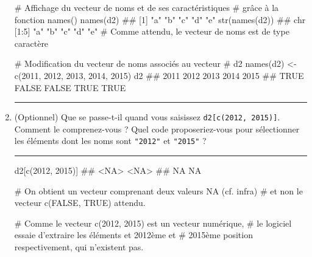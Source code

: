 \documentclass[12pt,twosided, notitlepage]{book}
\newenvironment{Shaded}{}{}
\newcommand{\KeywordTok}[1]{\textcolor[rgb]{0.00,0.00,1.00}{#1}}
\newcommand{\DecValTok}[1]{#1}
\newcommand{\StringTok}[1]{\textcolor[rgb]{0.00,0.50,0.50}{#1}}
\newcommand{\CommentTok}[1]{\textcolor[rgb]{0.00,0.50,0.00}{#1}}
\newcommand{\NormalTok}[1]{#1}
\newif \ifsol
\renewenvironment{Shaded}{\begin{snugshade}}{\end{snugshade}}
\begin{document}
\begin{enumerate}
\begin{Shaded}
\begin{Highlighting}[]
\CommentTok{# Affichage du vecteur de noms et de ses caractéristiques}
\CommentTok{# grâce à la fonction names()}
\KeywordTok{names}\NormalTok{(d2)}
\NormalTok{  ## [1] "a" "b" "c" "d" "e"}
\KeywordTok{str}\NormalTok{(}\KeywordTok{names}\NormalTok{(d2))}
\NormalTok{  ##  chr [1:5] "a" "b" "c" "d" "e"}
\CommentTok{# Comme attendu, le vecteur de noms est de type caractère}

\CommentTok{# Modification du vecteur de noms associés au vecteur}
\CommentTok{# d2}
\KeywordTok{names}\NormalTok{(d2) <-}\StringTok{ }\KeywordTok{c}\NormalTok{(}\DecValTok{2011}\NormalTok{, }\DecValTok{2012}\NormalTok{, }\DecValTok{2013}\NormalTok{, }\DecValTok{2014}\NormalTok{, }\DecValTok{2015}\NormalTok{)}
\NormalTok{d2}
\NormalTok{  ##  2011  2012  2013  2014  2015 }
\NormalTok{  ##  TRUE FALSE FALSE  TRUE  TRUE}
\end{Highlighting}
\end{Shaded}

  \begin{center} \rule{0.5\linewidth}{\linethickness}\end{center}

  \bigskip  \fi 
\item
  (Optionnel) Que se passe-t-il quand vous saisissez
  \texttt{d2{[}c(2012,\ 2015){]}}\index{\texttt{[}}. Comment le
  comprenez-vous ? Quel code proposeriez-vous pour sélectionner les
  éléments dont les noms sont \texttt{"2012"} et \texttt{"2015"} ?

  \ifsol  \textbf{Indication} Quel est le type du vecteur de noms
  associé à \texttt{d2} ?\fi  \ifsol 

  \begin{center} \rule{0.5\linewidth}{\linethickness}\end{center}

\begin{Shaded}
\begin{Highlighting}[]
\NormalTok{d2[}\KeywordTok{c}\NormalTok{(}\DecValTok{2012}\NormalTok{, }\DecValTok{2015}\NormalTok{)]}
\NormalTok{  ## <NA> <NA> }
\NormalTok{  ##   NA   NA}

\CommentTok{# On obtient un vecteur comprenant deux valeurs NA (cf. infra)}
\CommentTok{# et non le vecteur c(FALSE, TRUE) attendu.}

\CommentTok{# Comme le vecteur c(2012, 2015) est un vecteur numérique, }
\CommentTok{# le logiciel essaie d'extraire les éléments et 2012ème et }
\CommentTok{# 2015ème position respectivement, qui n'existent pas.}


\end{Highlighting}
\end{Shaded}
\end{enumerate}
\end{document}
